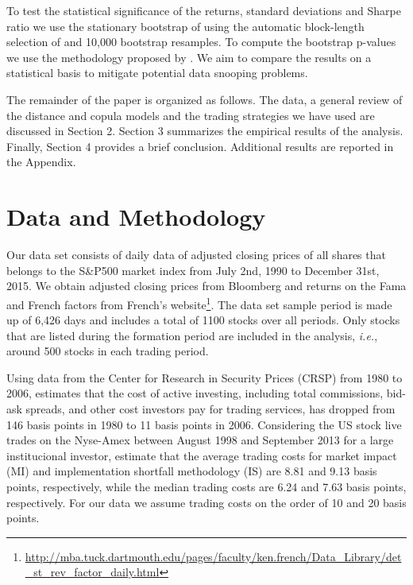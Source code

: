 \documentclass[a4paper]{article}
\begin{document}
	To test the statistical significance of the returns, standard deviations and Sharpe ratio we use the stationary bootstrap of \citet*{pr94} using the automatic block-length selection of \citet*{pw04} and 10,000 bootstrap resamples. To compute the bootstrap p-values we use the methodology proposed by \citet*{lw08}. We aim to compare the results on a statistical basis to mitigate potential data snooping problems.
	
	The remainder of the paper is organized as follows. The data, a general review of the distance and copula models and the trading strategies we have used are discussed in Section 2. Section 3 summarizes the empirical results of the analysis. Finally, Section 4 provides a brief conclusion. Additional results are reported in the Appendix.
	
	\vspace{0.6cm}
	
	\section{Data and Methodology}
	
	Our data set consists of daily data of adjusted closing prices of all shares that belongs to the S\&P500 market index from July 2nd, 1990 to December 31st, 2015. We obtain adjusted closing prices from Bloomberg and returns on the Fama and French factors from French's website\footnote{\url{http://mba.tuck.dartmouth.edu/pages/faculty/ken.french/Data_Library/det_st_rev_factor_daily.html}}. The data set sample period is made up of 6,426 days and includes a total of 1100 stocks over all periods. Only stocks that are listed during the formation period are included in the analysis, \emph{i.e.}, around 500 stocks in each trading period.
	

	Using data from the Center for Research in Security Prices (CRSP) from 1980 to 2006, \citet*{french2008} estimates that the cost of active investing, including total commissions, bid-ask spreads, and other cost investors pay for trading services, has dropped from 146 basis points in 1980 to 11 basis points in 2006. Considering the US stock live trades on the Nyse-Amex between August 1998 and September 2013 for a large institucional investor, \citet*{fim15} estimate that the average trading costs for market impact (MI) and implementation shortfall methodology (IS) are 8.81 and 9.13 basis points, respectively, while the median trading costs are 6.24 and 7.63 basis points, respectively. For our data we assume trading costs on the order of 10 and 20 basis points.
	
\end{document}
